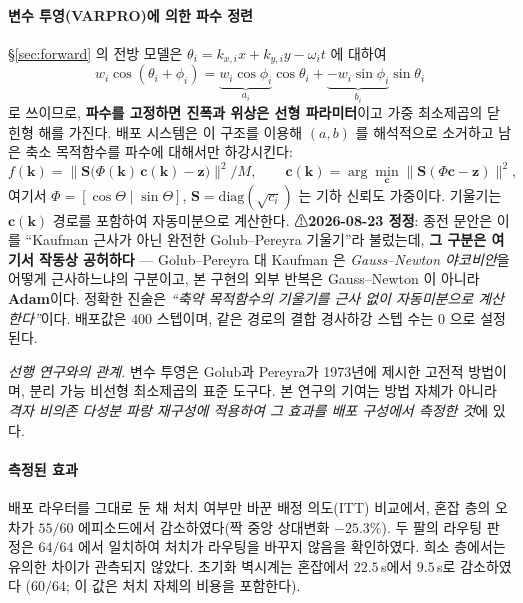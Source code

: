 \documentclass[11pt]{report}
\numberwithin{equation}{chapter}
\numberwithin{figure}{chapter}
\numberwithin{table}{chapter}
\begin{document}
\paragraph{변수 투영(VARPRO)에 의한 파수 정련}
\S\ref{sec:forward} 의 전방 모델은 $\theta_i = k_{x,i}x + k_{y,i}y - \omega_i t$ 에 대하여
\begin{equation}
w_i\cos(\theta_i + \phi_i) = \underbrace{w_i\cos\phi_i}_{a_i}\cos\theta_i
                            + \underbrace{-w_i\sin\phi_i}_{b_i}\sin\theta_i
\label{eq:polar-linear}
\end{equation}
로 쓰이므로, \textbf{파수를 고정하면 진폭과 위상은 선형 파라미터}이고 가중 최소제곱의
닫힌형 해를 가진다. 배포 시스템은 이 구조를 이용해 $(a,b)$ 를 해석적으로 소거하고
남은 축소 목적함수를 파수에 대해서만 하강시킨다:
\begin{equation}
f(\mathbf{k}) = \bigl\| \mathbf{S}\bigl(\Phi(\mathbf{k})\,
                \mathbf{c}(\mathbf{k}) - \mathbf{z}\bigr) \bigr\|^2 / M,
\qquad
\mathbf{c}(\mathbf{k}) = \arg\min_{\mathbf{c}}
   \bigl\| \mathbf{S}(\Phi \mathbf{c} - \mathbf{z}) \bigr\|^2 ,
\label{eq:varpro}
\end{equation}
여기서 $\Phi = [\cos\Theta \mid \sin\Theta]$, $\mathbf{S} = \mathrm{diag}(\sqrt{c_i})$ 는
기하 신뢰도 가중이다. 기울기는 $\mathbf{c}(\mathbf{k})$ 경로를 포함하여 자동미분으로
계산한다. ⚠\textbf{2026-08-23 정정}: 종전 문안은 이를 ``Kaufman 근사가 아닌 완전한
Golub--Pereyra 기울기''라 불렀는데, \textbf{그 구분은 여기서 작동상 공허하다} ---
Golub--Pereyra 대 Kaufman 은 \emph{Gauss--Newton 야코비안}을 어떻게 근사하느냐의
구분이고, 본 구현의 외부 반복은 Gauss--Newton 이 아니라 \textbf{Adam}이다.
정확한 진술은 \emph{``축약 목적함수의 기울기를 근사 없이 자동미분으로 계산한다''}이다. 배포값은 $400$ 스텝이며,
같은 경로의 결합 경사하강 스텝 수는 $0$ 으로 설정된다.

\emph{선행 연구와의 관계.} 변수 투영은 Golub과 Pereyra가 1973년에 제시한 고전적 방법이며,
분리 가능 비선형 최소제곱의 표준 도구다. 본 연구의 기여는 방법 자체가 아니라
\emph{격자 비의존 다성분 파랑 재구성에 적용하여 그 효과를 배포 구성에서 측정한 것}에 있다.

\paragraph{측정된 효과}
배포 라우터를 그대로 둔 채 처치 여부만 바꾼 배정 의도(ITT) 비교에서, 혼잡 층의 오차가
$55/60$ 에피소드에서 감소하였다(짝 중앙 상대변화 $-25.3\%$). 두 팔의 라우팅 판정은
$64/64$ 에서 일치하여 처치가 라우팅을 바꾸지 않음을 확인하였다. 희소 층에서는 유의한
차이가 관측되지 않았다. 초기화 벽시계는 혼잡에서 $22.5$\,s에서 $9.5$\,s로 감소하였다
($60/64$; 이 값은 처치 자체의 비용을 포함한다).
\end{document}
